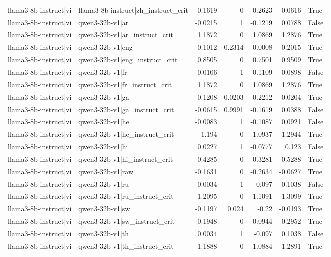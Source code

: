 \begin{table}
\begin{tabular}{l l r r r r l}
llama3-8b-instruct|vi & llama3-8b-instruct|zh_instruct_crit & -0.1619 & 0 & -0.2623 & -0.0616 & True \\
llama3-8b-instruct|vi & qwen3-32b-v1|ar & -0.0215 & 1 & -0.1219 & 0.0788 & False \\
llama3-8b-instruct|vi & qwen3-32b-v1|ar_instruct_crit & 1.1872 & 0 & 1.0869 & 1.2876 & True \\
llama3-8b-instruct|vi & qwen3-32b-v1|eng & 0.1012 & 0.2314 & 0.0008 & 0.2015 & True \\
llama3-8b-instruct|vi & qwen3-32b-v1|eng_instruct_crit & 0.8505 & 0 & 0.7501 & 0.9509 & True \\
llama3-8b-instruct|vi & qwen3-32b-v1|fr & -0.0106 & 1 & -0.1109 & 0.0898 & False \\
llama3-8b-instruct|vi & qwen3-32b-v1|fr_instruct_crit & 1.1872 & 0 & 1.0869 & 1.2876 & True \\
llama3-8b-instruct|vi & qwen3-32b-v1|ga & -0.1208 & 0.0203 & -0.2212 & -0.0204 & True \\
llama3-8b-instruct|vi & qwen3-32b-v1|ga_instruct_crit & -0.0615 & 0.9991 & -0.1619 & 0.0388 & False \\
llama3-8b-instruct|vi & qwen3-32b-v1|he & -0.0083 & 1 & -0.1087 & 0.0921 & False \\
llama3-8b-instruct|vi & qwen3-32b-v1|he_instruct_crit & 1.194 & 0 & 1.0937 & 1.2944 & True \\
llama3-8b-instruct|vi & qwen3-32b-v1|hi & 0.0227 & 1 & -0.0777 & 0.123 & False \\
llama3-8b-instruct|vi & qwen3-32b-v1|hi_instruct_crit & 0.4285 & 0 & 0.3281 & 0.5288 & True \\
llama3-8b-instruct|vi & qwen3-32b-v1|raw & -0.1631 & 0 & -0.2634 & -0.0627 & True \\
llama3-8b-instruct|vi & qwen3-32b-v1|ru & 0.0034 & 1 & -0.097 & 0.1038 & False \\
llama3-8b-instruct|vi & qwen3-32b-v1|ru_instruct_crit & 1.2095 & 0 & 1.1091 & 1.3099 & True \\
llama3-8b-instruct|vi & qwen3-32b-v1|sw & -0.1197 & 0.024 & -0.22 & -0.0193 & True \\
llama3-8b-instruct|vi & qwen3-32b-v1|sw_instruct_crit & 0.1948 & 0 & 0.0944 & 0.2952 & True \\
llama3-8b-instruct|vi & qwen3-32b-v1|th & 0.0034 & 1 & -0.097 & 0.1038 & False \\
llama3-8b-instruct|vi & qwen3-32b-v1|th_instruct_crit & 1.1888 & 0 & 1.0884 & 1.2891 & True \\

\end{tabular}
\end{table}

